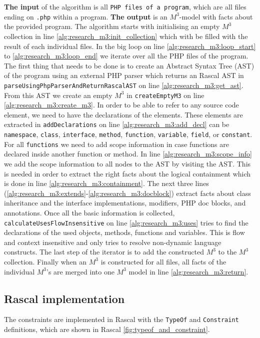 \documentclass[../main.tex]{subfiles}
\begin{document}
	\textbf{The input} of the algorithm is all \texttt{PHP files of a program}, which are all files ending on \texttt{.php} within a program.
    \textbf{The output} is an $M^3$-model with facts about the provided program.
    The algorithm starts with initialising an empty $M^3$ collection in line \ref{alg:research_m3:init_collection} which with be filled with the result of each individual files.
    In the big loop on line \ref{alg:research_m3:loop_start} to \ref{alg:research_m3:loop_end} we iterate over all the PHP files of the program.
    The first thing that needs to be done is to create an Abstract Syntax Tree (\gls{AST}) of the program using an external PHP parser\footnotemark{} which returns an Rascal AST in \texttt{parseUsingPhpParserAndReturnRascalAST} on line \ref{alg:research_m3:get_ast}.
    From this AST we create an empty $M^3$ in \texttt{createEmptyM3} on line \ref{alg:research_m3:create_m3}.
    In order to be able to refer to any source code element, we need to have the declarations of the elements.
    These elements are extracted in \texttt{addDeclarations} on line \ref{alg:research_m3:add_decl} can be \texttt{namespace}, \texttt{class}, \texttt{interface}, \texttt{method},  \texttt{function}, \texttt{variable}, \texttt{field}, or \texttt{constant}.
    For all \texttt{functions} we need to add scope information in case functions are declared inside another function or method.
    In line \ref{alg:research_m3:scope_info} we add the scope information to all nodes to the AST by visiting the AST.
    This is needed in order to extract the right facts about the logical containment which is done in line \ref{alg:research_m3:containment}.
    The next three lines (\ref{alg:research_m3:extends}-\ref{alg:research_m3:docblock}) extract facts about class inheritance and the interface implementations, modifiers, PHP doc blocks, and annotations.
   	Once all the basic information is collected, \texttt{calculateUsesFlowInsensitive} on line \ref{alg:research_m3:uses} tries to find the declarations of the used objects, methods, functions and variables.
   	This is flow and context insensitive and only tries to resolve non-dynamic language constructs.
   	The last step of the iterator is to add the constructed $M^3$ to the $M^3$ collection.
   	Finally when an $M^3$ is constructed for all files, all facts of the individual $M^3$'s are merged into one $M^3$ model in line \ref{alg:research_m3:return}. 
       \subsection{Rascal implementation}
    The constraints are implemented in Rascal with the \texttt{TypeOf} and \texttt{Constraint} definitions, which are shown in Rascal \ref{fig:typeof_and_constraint}.
    
\end{document}
